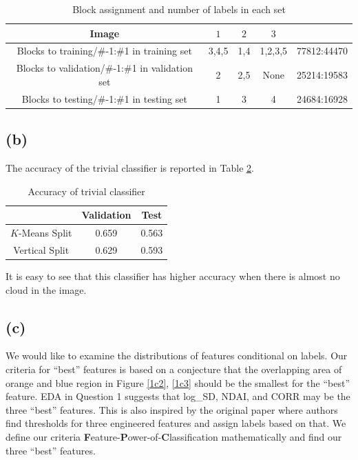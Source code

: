 \documentclass[11pt]{article}
\theoremstyle{definition}
\begin{document}
\begin{table}[h]
    \centering
    \begin{tabular}{c||c|c|c||c}
    Image
    & $1$
    & $2$
    & $3$ 
    &\\
    \hline
    \hline
    Blocks to training/\#-1:\#1 in training set
    & 3,4,5
    & 1,4
    & 1,2,3,5 
    & 77812:44470\\
    \hline
    Blocks to validation/\#-1:\#1 in validation set
    & 2
    & 2,5
    & None 
    & 25214:19583\\
    \hline
    Blocks to testing/\#-1:\#1 in testing set 
    & 1
    & 3
    & 4
    & 24684:16928

    \end{tabular}
    \caption{Block assignment and number of labels in each set}
    \label{tab4}
\end{table}
\FloatBarrier



 

\subsection*{(b)}
The accuracy of the trivial classifier is reported in Table \ref{tab5}.
\begin{table}[h]
    \centering
    \begin{tabular}{c||c|c}
    
    & Validation
    & Test\\
    \hline
    \hline
    $K$-Means Split
    & 0.659
    & 0.563\\
    \hline
    Vertical Split
    & 0.629
    & 0.593

    \end{tabular}
    \caption{Accuracy of trivial classifier}
    \label{tab5}
\end{table}
\FloatBarrier
It is easy to see that this classifier has higher accuracy when there is almost no cloud in the image.

\subsection*{(c)}
We would like to examine the distributions of features conditional on labels. Our criteria for ``best'' features is based on a conjecture that the overlapping area of orange and blue region in Figure \ref{1c2}, \ref{1c3} should be the smallest for the ``best'' feature. EDA in Question 1 suggests that log\_SD, NDAI, and CORR may be the three ``best'' features. This is also inspired by the original paper where authors find thresholds for three engineered features and assign labels based on that. We define our criteria \textbf{F}eature-\textbf{P}ower-of-\textbf{C}lassification mathematically and find our three ``best'' features.
\end{document}
